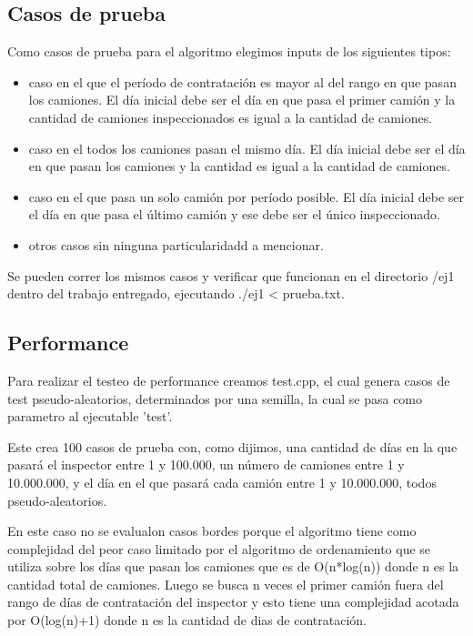 \subsection{Casos de prueba}

Como casos de prueba para el algoritmo elegimos inputs de los siguientes tipos:

\begin{itemize}
\item caso en el que el per\'iodo de contrataci\'on es mayor al del rango en que pasan los camiones. El d\'ia inicial debe ser el d\'ia en que pasa el primer cami\'on y la cantidad de camiones inspeccionados es igual a la cantidad de camiones.
\item caso en el todos los camiones pasan el mismo d\'ia. El d\'ia inicial debe ser el d\'ia en que pasan los camiones y la cantidad es igual a la cantidad de camiones.
\item caso en el que pasa un solo cami\'on por per\'iodo posible. El d\'ia inicial debe ser el d\'ia en que pasa el \'ultimo cami\'on y ese debe ser el \'unico inspeccionado.
\item otros casos sin ninguna particularidadd a mencionar.
\end{itemize}	

Se pueden correr los mismos casos y verificar que funcionan en el directorio /ej1 dentro del trabajo entregado, ejecutando ./ej1 < prueba.txt.

\subsection{Performance}

Para realizar el testeo de performance creamos test.cpp, el cual genera casos de test pseudo-aleatorios, determinados por una semilla, la cual se pasa como parametro al ejecutable 'test'. 

Este crea 100 casos de prueba con, como dijimos, una cantidad de d\'ias en la que pasar\'a el inspector entre 1 y 100.000, un n\'umero de camiones entre 1 y 10.000.000, y el d\'ia en el que pasar\'a cada cami\'on entre 1 y 10.000.000, todos pseudo-aleatorios.

En este caso no se evalualon casos bordes porque el algoritmo tiene como complejidad del peor caso limitado por el algoritmo de ordenamiento que se utiliza sobre los d\'ias que pasan los camiones que es de O(n*log(n)) donde n es la cantidad total de camiones.
Luego se busca n veces el primer cami\'on fuera del rango de d\'ias de contrataci\'on del inspector y esto tiene una complejidad acotada por O(log(n)+1) donde n es la cantidad de dias de contrataci\'on.

